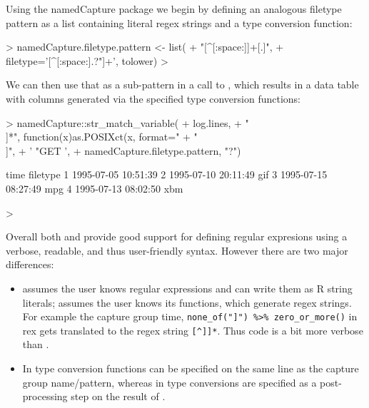 Using the namedCapture package we begin by defining an analogous
filetype pattern as a list containing literal regex strings and a type
conversion function:

\begin{Schunk}
\begin{Sinput}
> namedCapture.filetype.pattern <- list(
+   "[^[:space:]]+[.]", 
+   filetype='[^[:space:].?"]+', tolower)
> 
\end{Sinput}
\end{Schunk}

We can then use that as a sub-pattern in a call to
, which results in a data table with columns
generated via the specified type conversion functions:

\begin{Schunk}
\begin{Sinput}
> namedCapture::str_match_variable(
+   log.lines,
+   "\\[",
+   time="[^]]*", function(x)as.POSIXct(x, format="%d/%b/%Y:%H:%M:%S %z"),
+   "\\]",
+   ' "GET ',
+   namedCapture.filetype.pattern, "?")
\end{Sinput}
\begin{Soutput}
                 time filetype
1 1995-07-05 10:51:39         
2 1995-07-10 20:11:49      gif
3 1995-07-15 08:27:49      mpg
4 1995-07-13 08:02:50      xbm
\end{Soutput}
\begin{Sinput}
> 
\end{Sinput}
\end{Schunk}

Overall both  and  provide good
support for defining regular expresions using a verbose, readable, and
thus user-friendly syntax. However there are two major differences:
\begin{itemize}
\item {} assumes the user knows regular
  expressions and can write them as R string literals; 
  assumes the user knows its functions, which generate regex
  strings. For example the capture group time,
  \verb|none_of("]") %>% zero_or_more()| in rex gets translated to the
  regex string \verb|[^]]*|. Thus  code is a bit more verbose than
  .
\item In  type conversion functions can be specified on the
  same line as the capture group name/pattern, whereas in  type conversions are
  specified as a post-processing step on the result of . 
\end{itemize}

